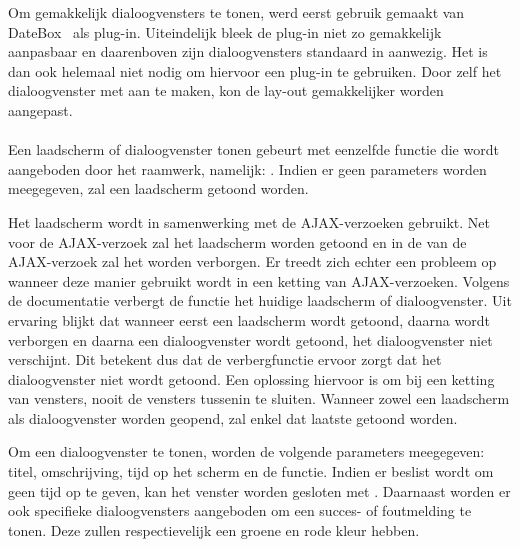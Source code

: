 Om gemakkelijk dialoogvensters te tonen, werd eerst gebruik gemaakt van DateBox~\cite{Sage2013} als plug-in.
Uiteindelijk bleek de plug-in niet zo gemakkelijk aanpasbaar en daarenboven zijn dialoogvensters standaard in \jqm{} aanwezig.
Het is dan ook helemaal niet nodig om hiervoor een plug-in te gebruiken.
Door zelf het dialoogvenster met \jqm{} aan te maken, kon de lay-out gemakkelijker worden aangepast.

\paragraph{\lungo}
Een laadscherm of dialoogvenster tonen gebeurt met eenzelfde functie die wordt aangeboden door het raamwerk, namelijk: .
Indien er geen parameters worden meegegeven, zal een laadscherm getoond worden.

Het laadscherm wordt in samenwerking met de AJAX-verzoeken gebruikt.
Net voor de AJAX-verzoek zal het laadscherm worden getoond en in de  van de AJAX-verzoek zal het worden verborgen.
Er treedt zich echter een probleem op wanneer deze manier gebruikt wordt in een ketting van AJAX-verzoeken.
Volgens de documentatie verbergt de functie  het huidige laadscherm of dialoogvenster. 
Uit ervaring blijkt dat wanneer eerst een laadscherm wordt getoond, daarna wordt verborgen en daarna een dialoogvenster wordt getoond, het dialoogvenster niet verschijnt.
Dit betekent dus dat de verbergfunctie ervoor zorgt dat het dialoogvenster niet wordt getoond.
Een oplossing hiervoor is om bij een ketting van vensters, nooit de vensters tussenin te sluiten.
Wanneer zowel een laadscherm als dialoogvenster worden geopend, zal enkel dat laatste getoond worden.

Om een dialoogvenster te tonen, worden de volgende parameters meegegeven: titel, omschrijving, tijd op het scherm en de  functie.
Indien er beslist wordt om geen tijd op te geven, kan het venster worden gesloten met .
Daarnaast worden er ook specifieke dialoogvensters aangeboden om een succes- of foutmelding te tonen.
Deze zullen respectievelijk een groene en rode kleur hebben.



\subsection{}
\label{sec:evaluatie-gebruik-formulieren}

